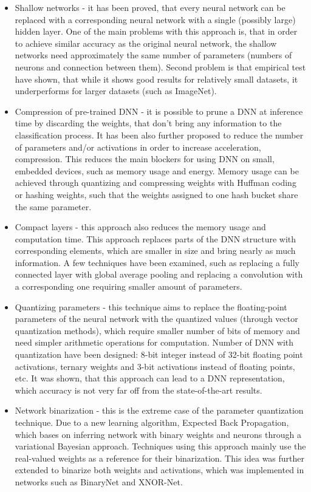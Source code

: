 \documentclass[licencjacka]{pracamgr}
\begin{document}
	\begin{itemize}
		\item Shallow networks - it has been proved, that every neural network can be replaced with a corresponding neural network with a single (possibly large) hidden layer. One of the main problems with this approach is, that in order to achieve similar accuracy as the original neural network, the shallow networks need approximately the same number of parameters (numbers of neurons and connection between them). Second problem is that empirical test have shown, that while it shows good results for relatively small datasets, it underperforms for larger datasets (such as ImageNet).
		\item Compression of pre-trained DNN - it is possible to prune a DNN at inference time by discarding the weights, that don’t bring any information to the classification process. It has been also further proposed to reduce the number of parameters and/or activations in order to increase acceleration, compression. This reduces the main blockers for using DNN on small, embedded devices, such as memory usage and energy. Memory usage can be achieved through quantizing and compressing weights with Huffman coding or hashing weights, such that the weights assigned to one hash bucket share the same parameter.
		\item Compact layers - this approach also reduces the memory usage and computation time. This approach replaces parts of the DNN structure with corresponding elements, which are smaller in size and bring nearly as much information. A few techniques have been examined, such as replacing a fully connected layer with global average pooling and replacing a convolution with a corresponding one requiring smaller amount of parameters.
		\item Quantizing parameters - this technique aims to replace the floating-point parameters of the neural network with the quantized values (through vector quantization methods), which require smaller number of bits of memory and need simpler arithmetic operations for computation. Number of DNN with quantization have been designed: 8-bit integer instead of 32-bit floating point activations, ternary weights and 3-bit activations instead of floating points, etc. It was shown, that this approach can lead to a DNN representation, which accuracy is not very far off from the state-of-the-art results.
		\item Network binarization - this is the extreme case of the parameter quantization technique. Due to a new learning algorithm, Expected Back Propagation, which bases on inferring network with binary weights and neurons through a variational Bayesian approach. Techniques using this approach mainly use the real-valued weights as a reference for their binarization. This idea was further extended to binarize both weights and activations, which was implemented in networks such as BinaryNet and XNOR-Net. 

	\end{itemize}
\end{document}

